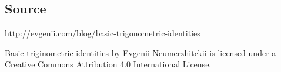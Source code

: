 \subsection*{Source}

\url{http://evgenii.com/blog/basic-trigonometric-identities}

Basic triginometric identities by Evgenii Neumerzhitckii is licensed under a Creative Commons Attribution 4.0 International License.
